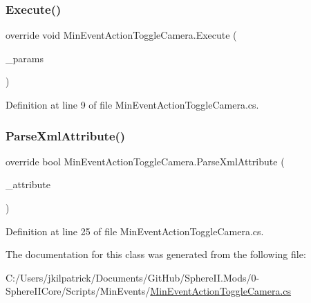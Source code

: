 \subsubsection{\texorpdfstring{Execute()}{Execute()}}
{\footnotesize\ttfamily override void Min\+Event\+Action\+Toggle\+Camera.\+Execute (\begin{DoxyParamCaption}\item[{Min\+Event\+Params}]{\+\_\+params }\end{DoxyParamCaption})}



Definition at line 9 of file Min\+Event\+Action\+Toggle\+Camera.\+cs.

\mbox{\label{class_min_event_action_toggle_camera_accf1db5c6da943b8112bda03eba4d453}} 
\subsubsection{\texorpdfstring{ParseXmlAttribute()}{ParseXmlAttribute()}}
{\footnotesize\ttfamily override bool Min\+Event\+Action\+Toggle\+Camera.\+Parse\+Xml\+Attribute (\begin{DoxyParamCaption}\item[{Xml\+Attribute}]{\+\_\+attribute }\end{DoxyParamCaption})}



Definition at line 25 of file Min\+Event\+Action\+Toggle\+Camera.\+cs.



The documentation for this class was generated from the following file\+:\begin{DoxyCompactItemize}
\item 
C\+:/\+Users/jkilpatrick/\+Documents/\+Git\+Hub/\+Sphere\+I\+I.\+Mods/0-\/\+Sphere\+I\+I\+Core/\+Scripts/\+Min\+Events/\mbox{\hyperlink{_min_event_action_toggle_camera_8cs}{Min\+Event\+Action\+Toggle\+Camera.\+cs}}\end{DoxyCompactItemize}
